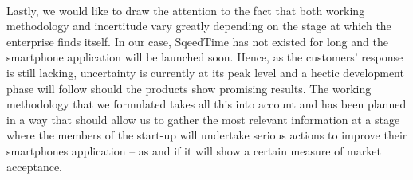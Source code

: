 \documentclass[twoside]{report}
\begin{document}
	\paragraph{}
	Lastly, we would like to draw the attention to the fact that both working methodology and incertitude vary greatly depending on the stage at which the enterprise finds itself. In our case, SqeedTime has not existed for long and the smartphone application will be launched soon. Hence, as the customers’ response is still lacking, uncertainty is currently at its peak level and a hectic development phase will follow should the products show promising results. The working methodology that we formulated takes all this into account and has been planned in a way that should allow us to gather the most relevant information at a stage where the members of the start-up will undertake serious actions to improve their smartphones application – as and if it will show a certain measure of market acceptance.
	\appendix
	
	
	
\end{document}
